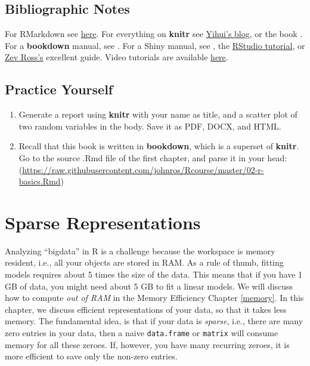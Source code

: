 \documentclass[]{book}
\theoremstyle{definition}
\theoremstyle{definition}
\theoremstyle{definition}
\theoremstyle{remark}
\begin{document}
\section{Bibliographic Notes}\label{bibliographic-notes-11}

For RMarkdown see \href{http://rmarkdown.rstudio.com/}{here}. For
everything on \textbf{knitr} see
\href{https://yihui.name/knitr/}{Yihui's blog}, or the book
\citet{xie2015dynamic}. For a \textbf{bookdown} manual, see
\citet{xie2016bookdown}. For a Shiny manual, see \citet{shiny}, the
\href{http://shiny.rstudio.com/tutorial/}{RStudio tutorial}, or
\href{http://zevross.com/blog/2016/04/19/r-powered-web-applications-with-shiny-a-tutorial-and-cheat-sheet-with-40-example-apps/}{Zev
Ross's} excellent guide. Video tutorials are available
\href{https://www.rstudio.com/resources/webinars/shiny-developer-conference/}{here}.

\section{Practice Yourself}\label{practice-yourself-9}

\begin{enumerate}
\def\labelenumi{\arabic{enumi}.}
\item
  Generate a report using \textbf{knitr} with your name as title, and a
  scatter plot of two random variables in the body. Save it as PDF,
  DOCX, and HTML.
\item
  Recall that this book is written in \textbf{bookdown}, which is a
  superset of \textbf{knitr}. Go to the source .Rmd file of the first
  chapter, and parse it in your head:
  (\url{https://raw.githubusercontent.com/johnros/Rcourse/master/02-r-basics.Rmd})
\end{enumerate}

\chapter{Sparse Representations}\label{sparse}

Analyzing ``bigdata'' in R is a challenge because the workspace is
memory resident, i.e., all your objects are stored in RAM. As a rule of
thumb, fitting models requires about 5 times the size of the data. This
means that if you have 1 GB of data, you might need about 5 GB to fit a
linear models. We will discuss how to compute \emph{out of RAM} in the
Memory Efficiency Chapter \ref{memory}. In this chapter, we discuss
efficient representations of your data, so that it takes less memory.
The fundamental idea, is that if your data is \emph{sparse}, i.e., there
are many zero entries in your data, then a naive \texttt{data.frame} or
\texttt{matrix} will consume memory for all these zeroes. If, however,
you have many recurring zeroes, it is more efficient to save only the
non-zero entries.
\end{document}
